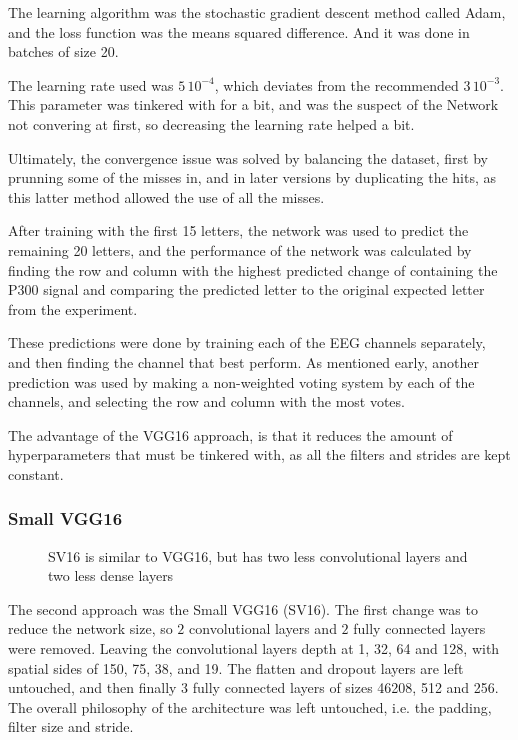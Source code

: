 \documentclass[conference]{IEEEtran}
\begin{document}
The learning algorithm was the stochastic gradient descent method called Adam\cite{adam2014}, and the loss function was the means squared difference. And it was done in batches of size 20. 

The learning rate used was $5\,10^{-4}$, which deviates from the recommended $3\, 10^{-3}$. This parameter was tinkered with for a bit, and was the suspect of the Network not convering at first, so decreasing the learning rate helped a bit.

Ultimately, the convergence issue was solved by balancing the dataset, first by prunning some of the misses in, and in later versions by duplicating the hits, as this latter method allowed the use of all the misses.

After training with the first 15 letters, the network was used to predict the remaining 20 letters, and the performance of the network was calculated by finding the row and column with the highest predicted change of containing the P300 signal and comparing the predicted letter to the original expected letter from the experiment.

These predictions were done by training each of the EEG channels separately, and then finding the channel that best perform. As mentioned early, another prediction was used by making a non-weighted voting system by each of the channels, and selecting the row and column with the most votes.

The advantage of the VGG16 approach, is that it reduces the amount of hyperparameters that must be tinkered with, as all the filters and strides are kept constant. 

\subsubsection{Small VGG16}
\begin{figure}[h]
\centering

\caption[SVG16 Neural Network]{SV16 is similar to VGG16, but has two less convolutional layers and two less dense layers}
\label{fig:nnv2}
\end{figure}

The second approach was the Small VGG16  (SV16). The first change was to reduce the network size, so $2$ convolutional layers and $2$ fully connected layers were removed. Leaving the convolutional layers depth at 1, 32, 64 and 128, with spatial sides of 150, 75, 38, and 19. The flatten and dropout layers are left untouched, and then finally $3$ fully connected layers of sizes 46208, 512 and 256. The overall philosophy of the architecture was left untouched, i.e. the padding, filter size and stride.
\end{document}
